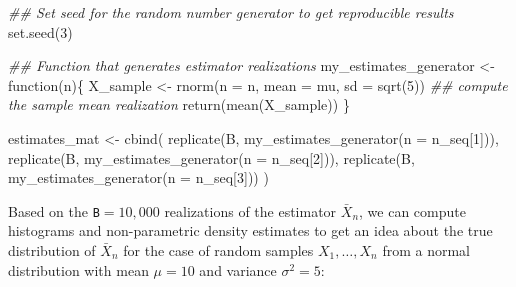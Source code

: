 \documentclass[
  letterpaper,
  DIV=11,
  numbers=noendperiod]{scrreprt}
\newenvironment{Shaded}{\begin{snugshade}}{\end{snugshade}}
\newcommand{\AttributeTok}[1]{\textcolor[rgb]{0.40,0.45,0.13}{#1}}
\newcommand{\ControlFlowTok}[1]{\textcolor[rgb]{0.00,0.23,0.31}{#1}}
\newcommand{\DecValTok}[1]{\textcolor[rgb]{0.68,0.00,0.00}{#1}}
\newcommand{\DocumentationTok}[1]{\textcolor[rgb]{0.37,0.37,0.37}{\textit{#1}}}
\newcommand{\FunctionTok}[1]{\textcolor[rgb]{0.28,0.35,0.67}{#1}}
\newcommand{\NormalTok}[1]{\textcolor[rgb]{0.00,0.23,0.31}{#1}}
\newcommand{\OtherTok}[1]{\textcolor[rgb]{0.00,0.23,0.31}{#1}}
\theoremstyle{definition}
\theoremstyle{plain}
\theoremstyle{plain}
\theoremstyle{remark}
\begin{document}
\begin{Shaded}
\begin{Highlighting}[]
\DocumentationTok{\#\# Set seed for the random number generator to get reproducible results}
\FunctionTok{set.seed}\NormalTok{(}\DecValTok{3}\NormalTok{)}

\DocumentationTok{\#\# Function that generates estimator realizations }
\NormalTok{my\_estimates\_generator }\OtherTok{\textless{}{-}} \ControlFlowTok{function}\NormalTok{(n)\{}
\NormalTok{  X\_sample }\OtherTok{\textless{}{-}} \FunctionTok{rnorm}\NormalTok{(}\AttributeTok{n =}\NormalTok{ n, }\AttributeTok{mean =}\NormalTok{ mu, }\AttributeTok{sd =} \FunctionTok{sqrt}\NormalTok{(}\DecValTok{5}\NormalTok{))}
  \DocumentationTok{\#\# compute the sample mean realization}
  \FunctionTok{return}\NormalTok{(}\FunctionTok{mean}\NormalTok{(X\_sample))}
\NormalTok{\}}

\NormalTok{estimates\_mat }\OtherTok{\textless{}{-}} \FunctionTok{cbind}\NormalTok{(}
  \FunctionTok{replicate}\NormalTok{(B, }\FunctionTok{my\_estimates\_generator}\NormalTok{(}\AttributeTok{n =}\NormalTok{ n\_seq[}\DecValTok{1}\NormalTok{])),}
  \FunctionTok{replicate}\NormalTok{(B, }\FunctionTok{my\_estimates\_generator}\NormalTok{(}\AttributeTok{n =}\NormalTok{ n\_seq[}\DecValTok{2}\NormalTok{])),}
  \FunctionTok{replicate}\NormalTok{(B, }\FunctionTok{my\_estimates\_generator}\NormalTok{(}\AttributeTok{n =}\NormalTok{ n\_seq[}\DecValTok{3}\NormalTok{]))}
\NormalTok{)}
\end{Highlighting}
\end{Shaded}

Based on the \texttt{B}\(=10,000\) realizations of the estimator
\(\bar{X}_n\), we can compute histograms and non-parametric density
estimates to get an idea about the true distribution of \(\bar{X}_n\)
for the case of random samples \(X_1,\dots,X_n\) from a normal
distribution with mean \(\mu=10\) and variance \(\sigma^2=5\):
\end{document}
